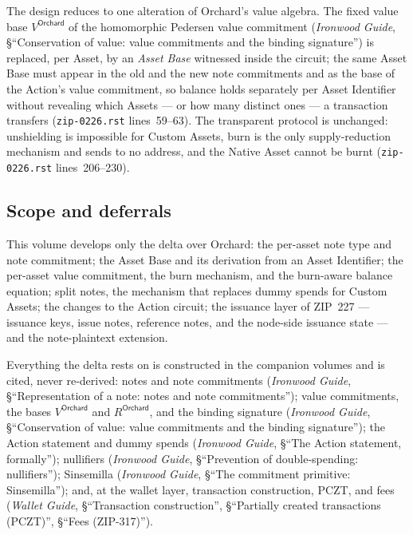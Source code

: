 \documentclass[11pt,a4paper]{article}
\theoremstyle{definition}
\begin{document}
The design reduces to one alteration of Orchard's value algebra. The fixed
value base $V^{\mathsf{Orchard}}$ of the homomorphic Pedersen value commitment
(\emph{Ironwood Guide}, \S``Conservation of value: value commitments and the
binding signature'') is replaced, per Asset, by an \emph{Asset Base} witnessed
inside the circuit; the same Asset Base must appear in the old and the new
note commitments and as the base of the Action's value commitment, so balance
holds separately per Asset Identifier without revealing which Assets --- or
how many distinct ones --- a transaction transfers (\texttt{zip-0226.rst}
lines~59--63). The transparent protocol is unchanged: unshielding is
impossible for Custom Assets, burn is the only supply-reduction mechanism and
sends to no address, and the Native Asset cannot be burnt
(\texttt{zip-0226.rst} lines~206--230).

\subsection{Scope and deferrals}\label{sec:zsa-deferrals}

This volume develops only the delta over Orchard: the per-asset note type and
note commitment; the Asset Base and its derivation from an Asset Identifier;
the per-asset value commitment, the burn mechanism, and the burn-aware balance
equation; split notes, the mechanism that replaces dummy spends for Custom
Assets; the changes to the Action circuit; the issuance layer of ZIP~227 ---
issuance keys, issue notes, reference notes, and the node-side issuance
state --- and the note-plaintext extension.

Everything the delta rests on is constructed in the companion volumes and is
cited, never re-derived: notes and note commitments (\emph{Ironwood Guide},
\S``Representation of a note: notes and note commitments''); value
commitments, the bases $V^{\mathsf{Orchard}}$ and $R^{\mathsf{Orchard}}$, and
the binding signature (\emph{Ironwood Guide}, \S``Conservation of value: value
commitments and the binding signature''); the Action statement and dummy
spends (\emph{Ironwood Guide}, \S``The Action statement, formally'');
nullifiers (\emph{Ironwood Guide}, \S``Prevention of double-spending:
nullifiers''); Sinsemilla (\emph{Ironwood Guide}, \S``The commitment primitive:
Sinsemilla''); and, at the wallet layer, transaction construction, PCZT, and
fees (\emph{Wallet Guide}, \S``Transaction construction'', \S``Partially
created transactions (PCZT)'', \S``Fees (ZIP-317)'').
\end{document}
